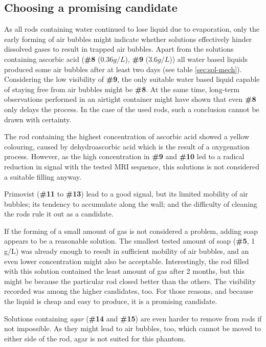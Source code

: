 \subsection{Choosing a promising candidate}
As all rods containing water continued to lose liquid due to evaporation, only the early forming of air bubbles might indicate whether solutions effectively hinder dissolved gases to result in trapped air bubbles.
Apart from the solutions containing ascorbic acid (\textbf{\#8} ($0.36 g/L$), \textbf{\#9} ($3.6 g/L$)) all water based liquids produced some air bubbles after at least two days (see table \ref{sec:sol-mech}).
Considering the low visibility of \textbf{\#9}, the only suitable water based liquid capable of staying free from air bubbles might be \textbf{\#8}.
At the same time, long-term observations performed in an airtight container might have shown that even \textbf{\#8} only delays the process.
In the case of the used rods, such a conclusion cannot be drawn with certainty.

The rod containing the highest concentration of ascorbic acid showed a yellow colouring, caused by dehydroascorbic acid which is the result of a oxygenation process.
However, as the high concentration in \textbf{\#9} and \textbf{\#10} led to a radical reduction in signal with the tested MRI sequence, this solutions is not considered a suitable filling anyway.

Primovist (\textbf{\#11} to \textbf{\#13}) lead to a good signal, but its limited mobility of air bubbles; its tendency to accumulate along the wall; and the difficulty of cleaning the rods rule it out as a candidate.

If the forming of  a small amount of gas is not considered a problem, adding soap appears to be a reasonable solution.
The smallest tested amount of soap (\textbf{\#5}, 1 g/L) was already enough to result in sufficient mobility of air bubbles, and an even lower concentration might also be acceptable.
Interestingly, the rod filled with this solution contained the least amount of gas after 2 months, but this might be because the particular rod closed better than the others.
The visibility recorded was among the higher candidates, too.
For those reasons, and because the liquid is cheap and easy to produce, it is a promising candidate.

Solutions containing \textit{agar} (\textbf{\#14} and \textbf{\#15}) are even harder to remove from rods if not impossible.
As they might lead to air bubbles, too, which cannot be moved to either side of the rod, agar is not suited for this phantom.

